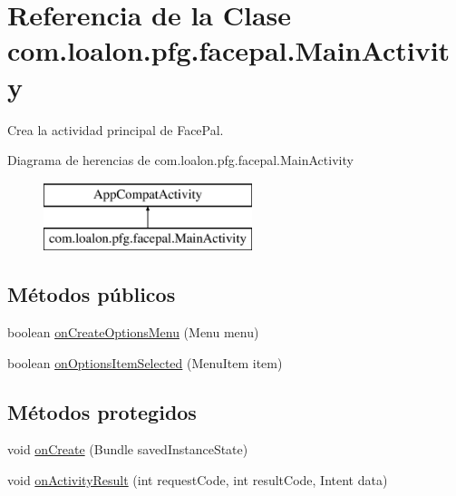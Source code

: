 \hypertarget{classcom_1_1loalon_1_1pfg_1_1facepal_1_1_main_activity}{}\section{Referencia de la Clase com.\+loalon.\+pfg.\+facepal.\+Main\+Activity}
\label{classcom_1_1loalon_1_1pfg_1_1facepal_1_1_main_activity}


Crea la actividad principal de Face\+Pal.  


Diagrama de herencias de com.\+loalon.\+pfg.\+facepal.\+Main\+Activity\begin{figure}[H]
\begin{center}
\leavevmode
\includegraphics[height=2.000000cm]{classcom_1_1loalon_1_1pfg_1_1facepal_1_1_main_activity}
\end{center}
\end{figure}
\subsection*{Métodos públicos}
\begin{DoxyCompactItemize}
\item 
boolean \mbox{\hyperlink{classcom_1_1loalon_1_1pfg_1_1facepal_1_1_main_activity_a68c25a115ed9a0e16de384c85b1d7b16}{on\+Create\+Options\+Menu}} (Menu menu)
\item 
boolean \mbox{\hyperlink{classcom_1_1loalon_1_1pfg_1_1facepal_1_1_main_activity_ad5d4581e431dc5c30fb26698c79519a9}{on\+Options\+Item\+Selected}} (Menu\+Item item)
\end{DoxyCompactItemize}
\subsection*{Métodos protegidos}
\begin{DoxyCompactItemize}
\item 
void \mbox{\hyperlink{classcom_1_1loalon_1_1pfg_1_1facepal_1_1_main_activity_a2b74b94bc6860ee9c91f64af87c19042}{on\+Create}} (Bundle saved\+Instance\+State)
\item 
void \mbox{\hyperlink{classcom_1_1loalon_1_1pfg_1_1facepal_1_1_main_activity_ad39232d66aa75c28cee996ee6dc97df2}{on\+Activity\+Result}} (int request\+Code, int result\+Code, Intent data)
\end{DoxyCompactItemize}


